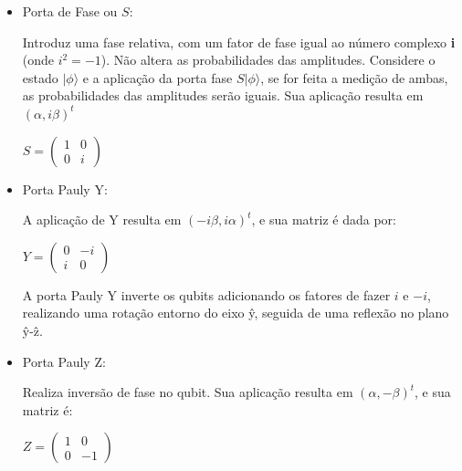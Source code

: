 \documentclass[tcc,capa]{texufpel}
\begin{document}
\begin{itemize}
    \item \begin{center} Porta de Fase ou $S$: \cite{chuang00a}
    \end{center}
    
    Introduz uma fase relativa, com um fator de fase igual ao número complexo \textbf{i} (onde $i^2=-1$). Não altera as probabilidades das amplitudes. Considere o estado $|\phi\rangle$  e a aplicação da porta fase $S|\phi\rangle$, se for feita a medição de ambas, as probabilidades das amplitudes serão iguais. Sua aplicação resulta em $(\alpha, i\beta)^t$
    
    \begin{center} 
    $ S=\left( \begin{array}{cc}
        1 & 0 \\
        0 & i
    \end{array}
    \right)
    $
    \end{center}
    \item \begin{center} Porta Pauly Y: \cite{chuang00a}
    \end{center}
    
A aplicação de Y resulta em $(-i \beta,i\alpha)^t$, e sua matriz é dada por:    
    
    \begin{center} $Y = \left( \begin{array}{cc}
        0 & -i \\
        i & 0
    \end{array}
    \right)$
\end{center}
A porta Pauly Y inverte os qubits adicionando os fatores de fazer $i$ e $-i$, realizando uma rotação entorno do eixo \^{y}, seguida de uma reflexão no plano \^{y}-\^{z}.

   \item \begin{center} Porta Pauly Z: \cite{chuang00a}
\end{center}
Realiza inversão de fase no qubit. Sua aplicação resulta em $(\alpha, -\beta)^t$, e sua matriz é:


\begin{center}
    
 $ Z= \left( \begin{array}{cc}
    1 & 0 \\
    0 & -1
\end{array}
\right)$
\end{center}


\end{itemize}
\end{document}
